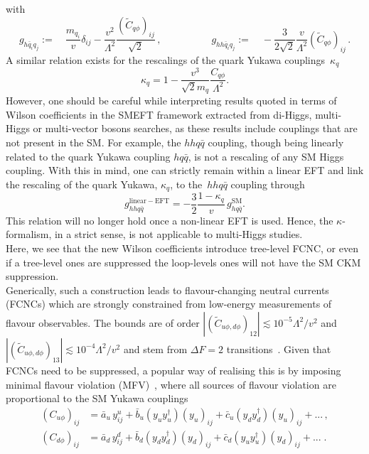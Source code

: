 with
\begin{equation}
	g_{h\bar{q}_i q_j} := \quad \frac{m_{q_i}}{v}\delta_{ij}-\frac{v^2}{\Lambda^2} \frac{(\tilde{C}_{q\phi})_{ij}}{\sqrt{2}}\,, \quad \quad \quad \quad \quad g_{h h\bar{q}_i q_j} := \quad -\frac{3}{2\sqrt{2}}\frac{v}{\Lambda^2}(\tilde{C}_{q\phi})_{ij}\,. 
	\label{eq:couplingsEFT}
\end{equation}
A similar relation exists for the rescalings of the quark Yukawa couplings~$\kappa_q$
\begin{equation}
	\kappa_q = 1- \frac{v^3}{\sqrt{2}m_q}\frac{C_{q\phi}}{\Lambda^2}.
\end{equation}
However, one should be careful while interpreting results quoted in terms of Wilson coefficients in the SMEFT framework extracted from di-Higgs, multi-Higgs or multi-vector bosons searches, as these results include couplings that are not present in the SM. For example, the $hh q\bar{q}$ coupling, though being linearly related to the quark Yukawa coupling $h q\bar{q}$, is not a rescaling of any SM Higgs coupling.  With this in mind, one can strictly remain within a linear EFT and link the rescaling of the quark Yukawa, $\kappa_q$, to the~$hh q\bar{q}$ coupling through
\begin{equation}
	g_{hhq\bar{q}}^{\mathrm{linear-EFT}} = -\frac{3}{2}\frac{1-\kappa_q}{v} \, g_{h q\bar{q}}^{\mathrm{SM}}.
\end{equation}
This relation will no longer hold once a non-linear EFT is used. Hence, the $\kappa$-formalism, in a strict sense, is not  applicable to multi-Higgs studies.\\
Here, we see that the new Wilson coefficients introduce tree-level FCNC, or even if a tree-level ones are suppressed the loop-levels ones will not have the SM CKM suppression.\\
Generically, such a construction leads to flavour-changing neutral currents (FCNCs) which are strongly constrained  from low-energy measurements of flavour observables. The bounds are of order $|(\tilde{C}_{u\phi,d\phi})_{12}| \lesssim 10^{-5}\Lambda^2/v^2$ and $|(\tilde{C}_{u\phi,d\phi})_{13}| \lesssim 10^{-4} \Lambda^2/v^2$ and stem from $\Delta F=2$ transitions~\cite{Blankenburg:2012ex, Harnik:2012pb}. Given that FCNCs need to be suppressed, a popular way of realising this is by imposing minimal flavour violation (MFV)~\cite{DAmbrosio:2002vsn}, where all sources of flavour violation are proportional to the SM Yukawa couplings
\begin{align}
	(C_{u\phi})_{ij} &= \bar{a}_u \, y_{ij}^u + \bar{b}_u (y_u y_u^{\dagger}) (y_u)_{ij}+ \bar{c}_u (y_d y_d^{\dagger})( y_u)_{ij} + ... \,, \nonumber
	\\ (C_{d\phi})_{ij} &= \bar{a}_d \, y^d_{ij} + \bar{b}_d (y_d y_d^{\dagger}) (y_d)_{ij}+ \bar{c}_d ( y_u y_u^{\dagger}) ( y_d)_{ij} + ...\;.
	\label{eq:mfv}
\end{align}
